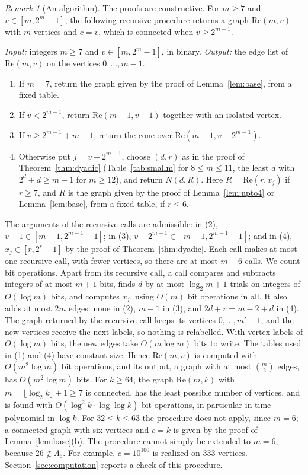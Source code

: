\documentclass[11pt]{amsart}
\theoremstyle{definition}
\theoremstyle{remark}
\newtheorem{remark}[theorem]{Remark}
\newcommand{\Lam}{\Lambda}
\begin{document}
\begin{remark}[An algorithm]\label{rem:algorithm}
The proofs are constructive. For $m\ge7$ and $v\in[m,2^m-1]$, the following recursive procedure returns a graph $\mathrm{Re}(m,v)$ with $m$ vertices and $c=v$, which is connected when $v\ge2^{m-1}$.

\emph{Input:} integers $m\ge7$ and $v\in[m,2^m-1]$, in binary. \emph{Output:} the edge list of $\mathrm{Re}(m,v)$ on the vertices $0,\dots,m-1$.
\begin{enumerate}[label=\textup{(\arabic*)}]
\item If $m=7$, return the graph given by the proof of Lemma~\ref{lem:base}, from a fixed table.
\item If $v<2^{m-1}$, return $\mathrm{Re}(m-1,v-1)$ together with an isolated vertex.
\item If $v\ge2^{m-1}+m-1$, return the cone over $\mathrm{Re}(m-1,v-2^{m-1})$.
\item Otherwise put $j=v-2^{m-1}$, choose $(d,r)$ as in the proof of Theorem~\ref{thm:dyadic} (Table~\ref{tab:smallm} for $8\le m\le11$, the least $d$ with $2^d+d\ge m-1$ for $m\ge12$), and return $N(d,R)$. Here $R=\mathrm{Re}(r,x_j)$ if $r\ge7$, and $R$ is the graph given by the proof of Lemma~\ref{lem:upto4} or Lemma~\ref{lem:base}, from a fixed table, if $r\le6$.
\end{enumerate}
The arguments of the recursive calls are admissible: in (2), $v-1\in[m-1,2^{m-1}-1]$; in (3), $v-2^{m-1}\in[m-1,2^{m-1}-1]$; and in (4), $x_j\in[r,2^r-1]$ by the proof of Theorem~\ref{thm:dyadic}. Each call makes at most one recursive call, with fewer vertices, so there are at most $m-6$ calls. We count bit operations. Apart from its recursive call, a call compares and subtracts integers of at most $m+1$ bits, finds $d$ by at most $\log_2m+1$ trials on integers of $O(\log m)$ bits, and computes $x_j$, using $O(m)$ bit operations in all. It also adds at most $2m$ edges: none in (2), $m-1$ in (3), and $2d+r=m-2+d$ in (4). The graph returned by the recursive call keeps its vertices $0,\dots,m'-1$, and the new vertices receive the next labels, so nothing is relabelled. With vertex labels of $O(\log m)$ bits, the new edges take $O(m\log m)$ bits to write. The tables used in (1) and (4) have constant size. Hence $\mathrm{Re}(m,v)$ is computed with $O(m^2\log m)$ bit operations, and its output, a graph with at most $\binom m2$ edges, has $O(m^2\log m)$ bits. For $k\ge64$, the graph $\mathrm{Re}(m,k)$ with $m=\lfloor\log_2k\rfloor+1\ge7$ is connected, has the least possible number of vertices, and is found with $O(\log^2k\cdot\log\log k)$ bit operations, in particular in time polynomial in $\log k$. For $32\le k\le63$ the procedure does not apply, since $m=6$; a connected graph with six vertices and $c=k$ is given by the proof of Lemma~\ref{lem:base}(b). The procedure cannot simply be extended to $m=6$, because $26\notin\Lam_6$. For example, $c=10^{100}$ is realized on $333$ vertices. Section~\ref{sec:computation} reports a check of this procedure.
\end{remark}
\end{document}
